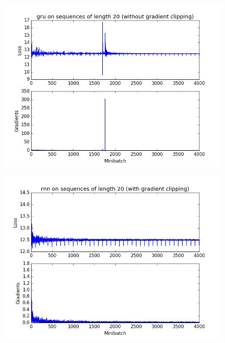\documentclass[10pt]{article}
\begin{document}
\begin{enumerate}[label=(\alph*)]
\begin{figure}[h]
\center
\includegraphics[scale=0.45]{q3-noclip-gru.png}
\end{figure}

\begin{figure}[h]
\center
\includegraphics[scale=0.45]{q3-clip-rnn.png}
\end{figure}


\end{enumerate}
\end{document}

